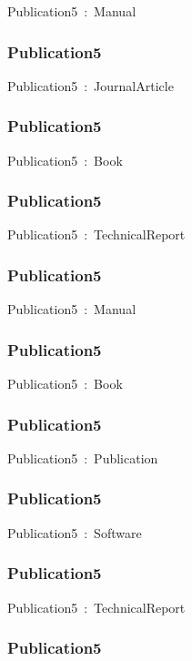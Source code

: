 \documentclass{article}
\begin{document}
Publication5~:~Manual

\subsubsection*{Publication5}

Publication5~:~JournalArticle

\subsubsection*{Publication5}

Publication5~:~Book

\subsubsection*{Publication5}

Publication5~:~TechnicalReport

\subsubsection*{Publication5}

Publication5~:~Manual

\subsubsection*{Publication5}

Publication5~:~Book

\subsubsection*{Publication5}

Publication5~:~Publication

\subsubsection*{Publication5}

Publication5~:~Software

\subsubsection*{Publication5}

Publication5~:~TechnicalReport

\subsubsection*{Publication5}
\end{document}
